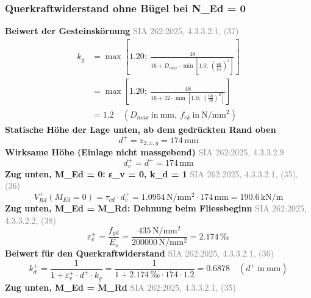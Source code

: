\documentclass[11pt,a4paper]{article}
\newcommand{\normref}[1]{{\small\textcolor{gray}{#1}}}
\begin{document}
\subsubsection{Querkraftwiderstand ohne Bügel bei N\_Ed = 0}
\noindent\textbf{Beiwert der Gesteinskörnung} \hfill \normref{SIA 262:2025, 4.3.3.2.1, (37)}
\begin{equation*}
\begin{aligned}
  k_g &= \max\left[1.20;\ \frac{48}{16 + D_{max} \cdot \min\left[1.0;\ \left(\frac{60}{f_{ck}}\right)^{2}\right]}\right] \\
  &= \max\left[1.20;\ \frac{48}{16 + 32 \cdot \min\left[1.0;\ \left(\frac{60}{30}\right)^{2}\right]}\right] \\
  &= 1.2 \quad \left(D_{max}\ \text{in}\ \mathrm{mm},\ f_{ck}\ \text{in}\ \mathrm{N}/\mathrm{mm}^{2}\right)
\end{aligned}
\end{equation*}
\noindent\textbf{Statische Höhe der Lage unten, ab dem gedrückten Rand oben}
\begin{equation*}
d^{+} = z_{2,x,g} = 174\,\mathrm{mm}
\end{equation*}
\noindent\textbf{Wirksame Höhe (Einlage nicht massgebend)} \hfill \normref{SIA 262:2025, 4.3.3.2.9}
\begin{equation*}
d_v^{+} = d^{+} = 174\,\mathrm{mm}
\end{equation*}
\noindent\textbf{Zug unten, M\_Ed = 0: ε\_v = 0, k\_d = 1} \hfill \normref{SIA 262:2025, 4.3.3.2.1, (35), (36)}
\begin{equation*}
V_{Rd}^{+}(M_{Ed} = 0) = \tau_{cd} \cdot d_v^{+} = 1.0954\,\mathrm{N}/\mathrm{mm}^{2} \cdot 174\,\mathrm{mm} = 190.6\,\mathrm{kN}/\mathrm{m}
\end{equation*}
\noindent\textbf{Zug unten, M\_Ed = M\_Rd: Dehnung beim Fliessbeginn} \hfill \normref{SIA 262:2025, 4.3.3.2.2, (38)}
\begin{equation*}
\varepsilon_v^{+} = \frac{f_{yd}}{E_s} = \frac{435\,\mathrm{N}/\mathrm{mm}^{2}}{200000\,\mathrm{N}/\mathrm{mm}^{2}} = 2.174\,\text{‰}
\end{equation*}
\noindent\textbf{Beiwert für den Querkraftwiderstand} \hfill \normref{SIA 262:2025, 4.3.3.2.1, (36)}
\begin{equation*}
k_d^{+} = \frac{1}{1 + \varepsilon_v^{+} \cdot d^{+} \cdot k_g} = \frac{1}{1 + 2.174\,\text{‰} \cdot 174 \cdot 1.2} = 0.6878 \quad \left(d^{+}\ \text{in}\ \mathrm{mm}\right)
\end{equation*}
\noindent\textbf{Zug unten, M\_Ed = M\_Rd} \hfill \normref{SIA 262:2025, 4.3.3.2.1, (35)}
\end{document}
